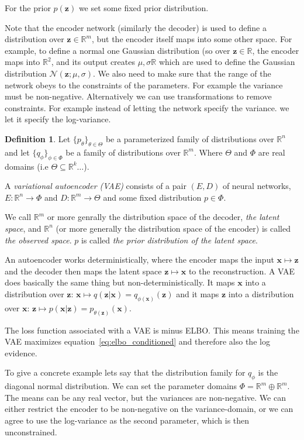 \documentclass[11pt, a4paper]{report}
\theoremstyle{plain}
\theoremstyle{definition}
\newtheorem{mydef}{Definition}[chapter]
\theoremstyle{remark}
\newcommand{\R}{\mathbb{R}}
\newcommand{\x}{\mathbf{x}}
\newcommand{\z}{\mathbf{z}}
\begin{document}
For the prior $p(\z)$ we set some fixed prior distribution.

Note that the encoder network (similarly the decoder) is used to define a distribution over
$\z \in \R^m$, but the encoder itself maps into some other space. 
For example,
to define a normal one Gaussian distribution (so over $\z \in \R$, the encoder
maps into $\R^2$, and its output creates $\mu, \sigma \R$ which are used to
define the Gaussian distribution $\mathcal{N}(\z ; \mu, \sigma)$.
We also need to make sure that the range of the network obeys to the constraints
of the parameters. For example the variance must be non-negative. 
Alternatively we can use transformations to remove constraints. For example
instead of letting the network specify the variance. we let it specify the
log-variance.

\begin{mydef}
\label{def:vae}
Let $\{p_{\theta}\}_{\theta \in \Theta}$ be a parameterized 
family of distributions over $\R^n$ and let
$\{q_{\phi}\}_{\phi \in \Phi}$ be a family of distributions over $\R^m$.
Where $\Theta$ and $\Phi$ are real domains (i.e $\Theta \subseteq \R^k \dots$).

A \emph{variational autoencoder (VAE)} consists of a pair $(E,D)$ of neural networks,
$E : \R^n \to \Phi$ and $D : \R^m \to \Theta$ and some fixed distribution $p \in
\Phi$.

We call $\R^m$ or more genrally the distribution space of the decoder, \emph{the latent
space}, and $\R^n$ (or more generally the distribution space of the encoder) is called
\emph{the observed space}.
$p$ is called \emph{the prior distribution of the latent space}.
\end{mydef}

An autoencoder works deterministically, where 
the encoder maps the input $\x \mapsto \z$ and the decoder then maps the
latent space $\z \mapsto \hat{\x}$ to the reconstruction. A VAE does
basically the same thing but non-deterministically.
It maps $\x$ into a distribution over $\z$: $\x \mapsto q(\z|\x) =
q_{\phi(\x)}(\z)$ and it maps
$\z$ into a distribution over $\x$: $\z \mapsto p(\x|\z) = p_{\theta(\z)}(\x)$.

The loss function associated with a VAE is minus ELBO. This means training
the VAE maximizes equation~\ref{eq:elbo_conditioned} and therefore also
the log evidence.

To give a concrete example lets say that the distribution family for $q_{\phi}$ 
is the diagonal normal distribution.
We can set the parameter domains $\Phi = \R^m \oplus \R^m$. The means can be any
real vector, but the variances are non-negative. We can either restrict the
encoder to be non-negative on the variance-domain, or we can agree to use the
log-variance as the second parameter, which is then unconstrained.
\end{document}
